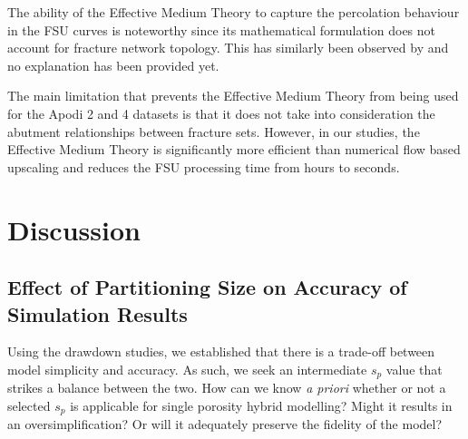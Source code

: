 \documentclass[draft]{agujournal2018}
\begin{document}
The ability of the Effective Medium Theory to capture the percolation behaviour in the FSU curves is noteworthy since its mathematical formulation does not account for fracture network topology. This has similarly been observed by \citet{Saevik2013} and no explanation has been provided yet.

The main limitation that prevents the Effective Medium Theory from being used for the Apodi 2 and 4 datasets is that it does not take into consideration the abutment relationships between fracture sets. However, in our studies, the Effective Medium Theory is significantly more efficient than numerical flow based upscaling and reduces the FSU processing time from hours to seconds.

\section{Discussion}
\label{discussion}

\subsection{Effect of Partitioning Size on Accuracy of Simulation Results}
Using the drawdown studies, we established that there is a trade-off between model simplicity and accuracy. As such, we seek an intermediate $s_p$ value that strikes a balance between the two. How can we know \textit{a priori} whether or not a selected $s_p$ is applicable for single porosity hybrid modelling? Might it results in an oversimplification? Or will it adequately preserve the fidelity of the model? 
\end{document}
